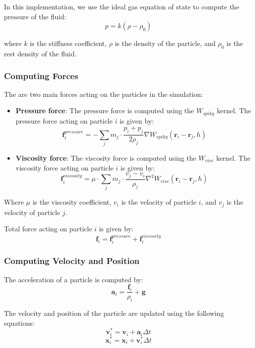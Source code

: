 \documentclass[a4paper]{article}
\begin{document}
In this implementation, we use the ideal gas equation of state to compute the pressure of the fluid:
\[
  p = k(\rho - \rho_0)
\]

where $k$ is the stiffness coefficient, $\rho$ is the density of the particle, and $\rho_0$ is the rest density of the fluid.

\subsubsection{Computing Forces}

The are two main forces acting on the particles in the simulation:
\begin{itemize}
  \item \textbf{Pressure force}:
    The pressure force is computed using the $W_{spiky}$ kernel. The pressure force acting on particle $i$ is given by:
    \begin{equation}
    \nonumber
      \mathbf{f}^{pressure}_i = -\sum_{j} m_j \cdot \frac{p_i + p_j}{2 \rho_j} \nabla W_{spiky}(\mathbf{r}_i - \mathbf{r}_j, h)
    \end{equation}
  \item \textbf{Viscosity force}:
    The viscosity force is computed using the $W_{visc}$ kernel. The viscosity force acting on particle $i$ is given by:
    \begin{equation}
    \nonumber
      \mathbf{f}^{viscosity}_i = \mu \cdot \sum_{j} m_j \cdot \frac{v_j - v_i}{\rho_j} \nabla^2 W_{visc}(\mathbf{r}_i - \mathbf{r}_j, h)
    \end{equation}
\end{itemize}

Where $\mu$ is the viscosity coefficient, $v_i$ is the velocity of particle $i$, and $v_j$ is the velocity of particle $j$.

Total force acting on particle $i$ is given by:
\[
  \mathbf{f}_i = \mathbf{f}^{pressure}_i + \mathbf{f}^{viscosity}_i
\]

\subsubsection{Computing Velocity and Position}

The acceleration of a particle is computed by:
\[
  \mathbf{a}_i = \frac{\mathbf{f}_i}{\rho_i} + \mathbf{g}
\]

The velocity and position of the particle are updated using the following equations:
\[
  \mathbf{v}_i^* = \mathbf{v}_i + \mathbf{a}_i \Delta t
\]
\[
  \mathbf{x}_i^* = \mathbf{x}_i + \mathbf{v}_i^* \Delta t
\]
\end{document}
